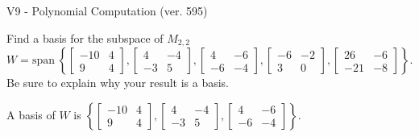\begin{exercise}
  \begin{exerciseTitle}V9 - Polynomial Computation (ver. 595)\end{exerciseTitle}
  \begin{exerciseStatement}
    Find a basis for the subspace of \(M_{2,2}\) 
\[W=\mathrm{span}\ \left\{\left[\begin{array}{cc}
-10 & 4 \\
9 & 4
\end{array}\right] , \left[\begin{array}{cc}
4 & -4 \\
-3 & 5
\end{array}\right] , \left[\begin{array}{cc}
4 & -6 \\
-6 & -4
\end{array}\right] , \left[\begin{array}{cc}
-6 & -2 \\
3 & 0
\end{array}\right] , \left[\begin{array}{cc}
26 & -6 \\
-21 & -8
\end{array}\right]\right\}.\]
 Be sure to explain why your result is a basis.


  \end{exerciseStatement}
  \begin{exerciseAnswer}
   A basis of \(W\) is  \(\left\{\left[\begin{array}{cc}
-10 & 4 \\
9 & 4
\end{array}\right] , \left[\begin{array}{cc}
4 & -4 \\
-3 & 5
\end{array}\right] , \left[\begin{array}{cc}
4 & -6 \\
-6 & -4
\end{array}\right]\right\}\).
  


  \end{exerciseAnswer}
\end{exercise}